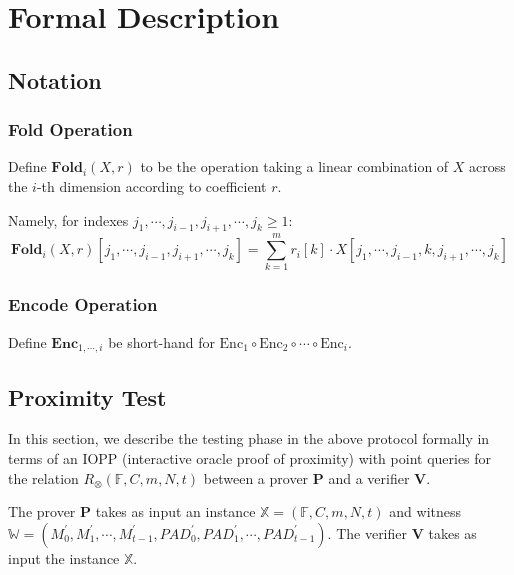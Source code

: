
\section{Formal Description}

\subsection{Notation}

\subsubsection{Fold Operation}

Define $\textbf{Fold}_i(X, r)$ to be the operation taking a linear combination of $X$ across the $i$-th dimension according to coefficient $r$. 

Namely, for indexes $j_1, \cdots, j_{i-1}, j_{i+1}, \cdots , j_{k} \ge 1$:
$$
\textbf{Fold}_i(X, r)[j_1, \cdots, j_{i-1}, j_{i+1}, \cdots , j_{k}] = \sum_{k=1}^{m} r_{i}[k] \cdot X[j_1, \cdots, j_{i-1}, k, j_{i+1}, \cdots , j_{k}]
$$

\subsubsection{Encode Operation}

Define $\textbf{Enc}_{1,\cdots,i}$ be short-hand for $\text{Enc}_1 \circ \text{Enc}_2 \circ \cdots \circ \text{Enc}_{i}$.

\subsection{Proximity Test}

In this section, we describe the testing phase in the above protocol formally in terms of an IOPP (interactive oracle proof of proximity) with point queries for the relation $R_\otimes(\mathbb{F}, C, m, N, t)$ between a prover $\textbf{P}$ and a verifier $\textbf{V}$.

The prover $\textbf{P}$ takes as input an instance $\mathbb{X} = (\mathbb{F}, C, m, N, t)$ and witness $\mathbb{W} = (M_0^{\prime}, M_1^{\prime}, \cdots, M_{t-1}^{\prime}, PAD_0^{\prime}, PAD_1^{\prime}, \cdots, PAD_{t-1}^{\prime})$. The verifier $\textbf{V}$ takes as input the instance $\mathbb{X}$.

